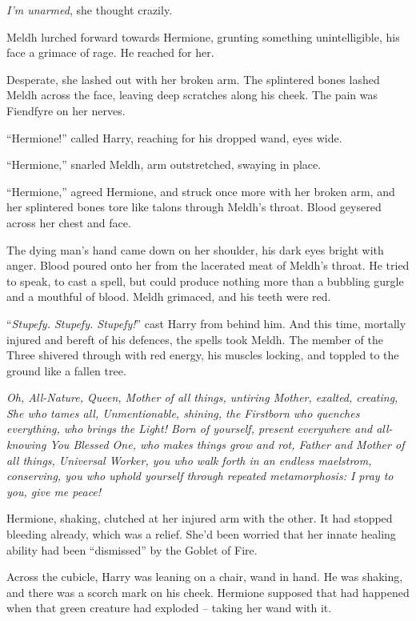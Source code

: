 \emph{I'm unarmed}, she thought crazily.

Meldh lurched forward towards Hermione, grunting something
unintelligible, his face a grimace of rage. He reached for her.

Desperate, she lashed out with her broken arm. The splintered bones
lashed Meldh across the face, leaving deep scratches along his cheek.
The pain was Fiendfyre on her nerves.

``Hermione!'' called Harry, reaching for his dropped wand, eyes wide.

``Hermione,'' snarled Meldh, arm outstretched, swaying in place.

``Hermione,'' agreed Hermione, and struck once more with her broken arm,
and her splintered bones tore like talons through Meldh's throat. Blood
geysered across her chest and face.

The dying man's hand came down on her shoulder, his dark eyes bright
with anger. Blood poured onto her from the lacerated meat of Meldh's
throat. He tried to speak, to cast a spell, but could produce nothing
more than a bubbling gurgle and a mouthful of blood. Meldh grimaced, and
his teeth were red.

``\emph{Stupefy. Stupefy. Stupefy!}'' cast Harry from behind him. And
this time, mortally injured and bereft of his defences, the spells took
Meldh. The member of the Three shivered through with red energy, his
muscles locking, and toppled to the ground like a fallen tree.

\mybreak

\emph{Oh, All-Nature, Queen, Mother of all things, untiring Mother,
exalted, creating, She who tames all, Unmentionable, shining, the
Firstborn who quenches everything, who brings the Light! Born of
yourself, present everywhere and all-knowing You Blessed One, who makes
things grow and rot, Father and Mother of all things, Universal Worker,
you who walk forth in an endless maelstrom, conserving, you who uphold
yourself through repeated metamorphosis: I pray to you, give me peace!}


\mybreak

Hermione, shaking, clutched at her injured arm with the other. It had
stopped bleeding already, which was a relief. She'd been worried that
her innate healing ability had been ``dismissed'' by the Goblet of Fire.

Across the cubicle, Harry was leaning on a chair, wand in hand. He was
shaking, and there was a scorch mark on his cheek. Hermione supposed
that had happened when that green creature had exploded -- taking her
wand with it.

